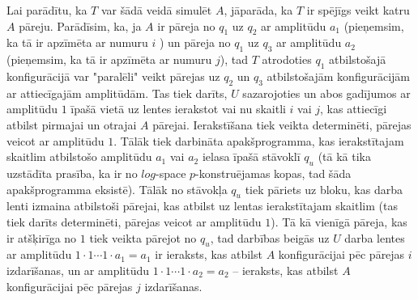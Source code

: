 \documentclass{ludis}
\begin{document}
Lai parādītu, ka $T$ var šādā veidā simulēt $A$, jāparāda, ka $T$ ir spējīgs veikt katru $A$ pāreju. Parādīsim, ka, ja $A$ ir pāreja no $q_1$ uz $q_2$ ar amplitūdu $a_1$ (pieņemsim, ka tā ir apzīmēta ar numuru $i$ ) un pāreja no $q_1$ uz $q_3$ ar amplitūdu $a_2$ (pieņemsim, ka tā ir apzīmēta ar numuru $j$), tad $T$ atrodoties $q_1$ atbilstošajā konfigurācijā var "paralēli" veikt pārejas uz $q_2$ un $q_3$ atbilstošajām konfigurācijām ar attiecīgajām amplitūdām. Tas tiek darīts, $U$ sazarojoties un abos gadījumos ar amplitūdu $1$ īpašā vietā uz lentes ierakstot vai nu skaitli $i$ vai $j$, kas attiecīgi atbilst pirmajai un otrajai $A$ pārejai. Ierakstīšana tiek veikta determinēti, pārejas veicot ar amplitūdu $1$. Tālāk tiek darbināta apakšprogramma, kas ierakstītajam skaitlim atbilstošo amplitūdu $a_1$ vai $a_2$ ielasa īpašā stāvoklī $q_u$ (tā kā tika uzstādīta prasība, ka ir no $log$-space $p$-konstruējamas kopas, tad šāda apakšprogramma eksistē). Tālāk no stāvokļa $q_u$ tiek pāriets uz bloku, kas darba lenti izmaina atbilstoši pārejai, kas atbilst uz lentas ierakstītajam skaitlim (tas tiek darīts determinēti, pārejas veicot ar amplitūdu $1$). Tā kā vienīgā pāreja, kas ir atšķirīga no $1$ tiek veikta pārejot no $q_u$, tad darbības beigās uz $U$ darba lentes ar amplitūdu $1 \cdot 1 \cdots 1 \cdot a_1 = a_1$ ir ieraksts, kas atbilst $A$ konfigurācijai pēc pārejas $i$ izdarīšanas, un ar amplitūdu $1 \cdot 1 \cdots 1 \cdot a_2 = a_2$ -- ieraksts, kas atbilst $A$ konfigurācijai pēc pārejas $j$ izdarīšanas.

\end{document}
